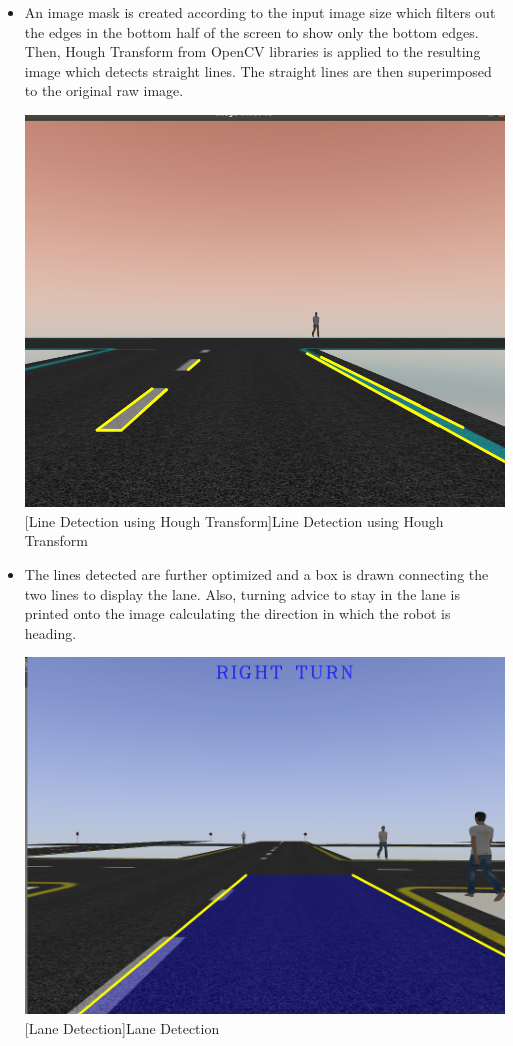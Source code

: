 \documentclass[%
xelatex,
	oneside,		%
	12pt,			%
	parskip=half,	%
	abstracton,
	chapterprefix=true%
    appendixprefix=true]
{scrbook}
\begin{document}
\begin{itemize}
\begin{center}
[Canny Edge Detection]{Canny Edge Detection}
\label{fig:canny}
\end{center}
\item An image mask is created according to the input image size which filters out the edges in the bottom half of the screen to show only the bottom edges. Then, Hough Transform from OpenCV libraries is applied to the resulting image which detects straight lines. The straight lines are then superimposed to the original raw image.
\begin{center}
\includegraphics[scale=0.3]{fig/hough.png}
[Line Detection using Hough Transform]{Line Detection using Hough Transform}
\label{fig:hough}
\end{center}
\item The lines detected are further optimized and a box is drawn connecting the two lines to display the lane. Also, turning advice to stay in the lane is printed onto the image calculating the direction in which the robot is heading.
\begin{center}
\includegraphics[scale=0.3]{fig/finaladas.png}
[Lane Detection]{Lane Detection}
\label{fig:lane}
\end{center}
	\end{itemize}
		
\end{document}
